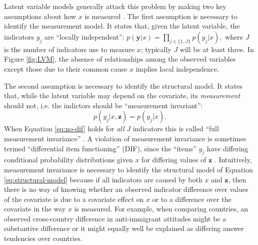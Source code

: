 Latent variable models generally attack this problem by making two key assumptions about how $x$ is measured \citep{skrondal2004generalized}. The first assumption is necessary to identify the measurement model. It states that, given the latent variable, the indicators $y_j$ are ``locally independent'': $
		p(\mathbf{y} | x) = \prod_{j \in \{1..J\}} p(y_j | x),
$ where $J$ is the number of indicators use to measure $x$; typically $J$ will be at least three. In Figure \ref{fig:LVM}, the  absence of relationships among the observed variables except those due to their common cause $x$ implies local independence.

The second assumption is necessary to identify the structural model. It states that, while the latent variable may depend on the covariate, its \emph{measurement} should not, i.e. the indictors should be ``measurement invariant'':
\begin{equation}
	p(y_j | x, \mathbf{z}) = p(y_j | x).
	\label{eq:no-dif}
\end{equation}
When Equation \ref{eq:no-dif} holds for \emph{all} $J$ indicators this is called ``full measurement invariance'' \citep{meredith1993measurement}. 
A violation of  measurement invariance is sometimes termed ``differential item functioning'' (DIF), since the ``items'' $y_j$ have differing conditional probability distributions given $x$ for differing values of $\mathbf{z}$ \citep{mellenbergh1989item}.
Intuitively, measurement invariance is necessary to identify the structural model of Equation \ref{eq:structural-model} because if all indicators are caused by both $x$ and $\mathbf{z}$, then there is no way of knowing whether an observed indicator difference  over values of the covariate is due to a covariate effect on  $x$ or to a difference over the covariate in the way $x$ is measured. For example, when comparing countries, an observed cross-country difference in anti-immigrant attitudes might be a substantive difference or it might equally well be explained as differing answer tendencies over countries. 

